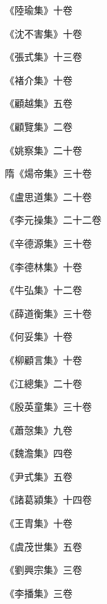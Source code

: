 \begin{pinyinscope}
 《陸瑜集》十卷



 《沈不害集》十卷



 《張式集》十三卷



 《褚介集》十卷



 《顧越集》五卷



 《顧覽集》二卷



 《姚察集》二十卷



 隋《煬帝集》三十卷



 《盧思道集》二十卷



 《李元操集》二十二卷



 《辛德源集》三十卷



 《李德林集》十卷



 《牛弘集》十二卷



 《薛道衡集》三十卷



 《何妥集》十卷



 《柳顧言集》十卷



 《江總集》二十卷



 《殷英童集》三十卷



 《蕭愨集》九卷



 《魏澹集》四卷



 《尹式集》五卷



 《諸葛潁集》十四卷



 《王胄集》十卷



 《虞茂世集》五卷



 《劉興宗集》三卷



 《李播集》三卷




\end{pinyinscope}
